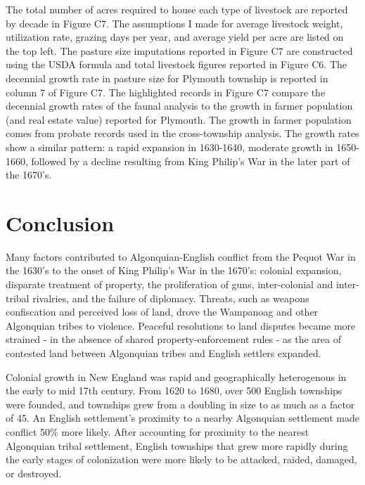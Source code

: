 \documentclass[sn-mathphys]{sn-jnl}%
\theoremstyle{thmstyleone}%
\theoremstyle{thmstyletwo}%
\theoremstyle{thmstylethree}%
\begin{document}
The total number of acres required to house each type of livestock are reported by decade in Figure C7. The assumptions I made for average livestock weight, utilization rate, grazing days per year, and average yield per acre are listed on the top left. The pasture size imputations reported in Figure C7 are constructed using the USDA formula and total livestock figures reported in Figure C6. The decennial growth rate in pasture size for Plymouth township is reported in column 7 of Figure C7. The highlighted records in Figure C7 compare the decennial growth rates of the faunal analysis to the growth in farmer population (and real estate value) reported for Plymouth. The growth in farmer population comes from probate records used in the cross-township analysis. The growth rates show a similar pattern:  a rapid expansion in 1630-1640, moderate growth in 1650-1660, followed by a decline resulting from King Philip's War in the later part of the 1670's.

\section{Conclusion}\label{sec13}

Many factors contributed to Algonquian-English conflict from the Pequot War in the 1630's to the onset of King Philip's War in the 1670's:  colonial expansion, disparate treatment of property, the proliferation of guns, inter-colonial and inter-tribal rivalries, and the failure of diplomacy. Threats, such as weapons confiscation and perceived loss of land, drove the Wampanoag and other Algonquian tribes to violence. Peaceful resolutions to land disputes became more strained - in the absence of shared property-enforcement rules - as the area of contested land between Algonquian tribes and English settlers expanded. %

Colonial growth in New England was rapid and geographically heterogenous in the early to mid 17th century. From 1620 to 1680, over 500 English townships were founded, and townships grew from a doubling in size to as much as a factor of 45. An English settlement's proximity to a nearby Algonquian settlement made conflict 50\% more likely. After accounting for proximity to the nearest Algonquian tribal settlement, English townships that grew more rapidly during the early stages of colonization were more likely to be attacked, raided, damaged, or destroyed.
\end{document}

